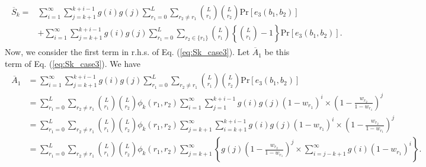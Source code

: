 \begin{align}\begin{split}\label{eq:Sk_case3}
	\overline{S}_k 
	=& \sum_{i=1}^{\infty}\sum_{j=k+1}^{k+i-1} g(i)g(j) \sum_{r_1=0}^{L} \sum_{r_2 \neq r_1} \binom{L}{r_1}\binom{L}{r_2}\mathrm{Pr}[e_3(b_1,b_2)]\\ 
	&+ \sum_{i=1}^{\infty}\sum_{j=k+1}^{k+i-1} g(i)g(j) \sum_{r_1=0}^{L} \sum_{r_2 \in \{r_1\}} \binom{L}{r_1} \left\{\binom{L}{r_1}-1 \right\}\mathrm{Pr}[e_3(b_1,b_2)].
\end{split}\end{align}
%
Now, we consider the first term in r.h.s. of Eq. (\ref{eq:Sk_case3}). Let $\overline{A}_1$ be this term of Eq. (\ref{eq:Sk_case3}). We have
\begin{align}\begin{split}\label{eq:A_1}
	\overline{A}_1
	&=\sum_{i=1}^{\infty}\sum_{j=k+1}^{k+i-1} g(i)g(j) \sum_{r_1=0}^{L} \sum_{r_2 \neq r_1} \binom{L}{r_1}\binom{L}{r_2}\mathrm{Pr}[e_3(b_1,b_2)] \\
	&=\sum_{r_1=0}^{L} \sum_{r_2 \neq r_1} \binom{L}{r_1}\binom{L}{r_2}\phi_k(r_1,r_2)
	\sum_{i=1}^{\infty} \sum_{j=1}^{k+i-1} g(i)g(j)(1-w_{r_1})^{i} \times \left(1-\frac{w_{r_2}}{1-w_{r_1}} \right)^{j} \\
	&=\sum_{r_1=0}^{L} \sum_{r_2 \neq r_1} \binom{L}{r_1}\binom{L}{r_2}\phi_k(r_1,r_2)
	\sum_{j=k+1}^{\infty} \sum_{i=k+1}^{k+i-1} g(i)g(j)(1-w_{r_1})^{i} \times \left(1-\frac{w_{r_2}}{1-w_{r_1}} \right)^{j} \\
	&=\sum_{r_1=0}^{L} \sum_{r_2 \neq r_1} \binom{L}{r_1}\binom{L}{r_2}\phi_k(r_1,r_2)
	\sum_{j=k+1}^{\infty} \left\{ g(j) \left(1-\frac{w_{r_2}}{1-w_{r_1}} \right)^{j} \times \sum_{i=j-k+1}^{\infty} g(i)(1-w_{r_1})^{i} \right\}.
\end{split}\end{align}
